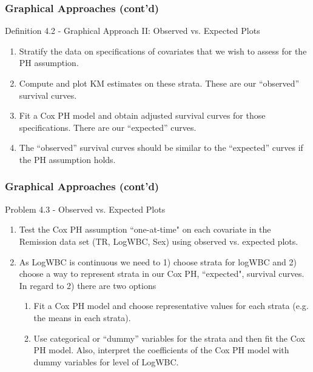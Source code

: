 \documentclass{beamer}
\theoremstyle{definition}
\begin{document}
\begin{frame}
\frametitle{Graphical Approaches (cont'd)}
\begin{block}{Definition 4.2 - Graphical Approach II: Observed vs. Expected Plots}
\begin{enumerate}
\item Stratify the data on specifications of covariates that we wish to assess for the PH assumption.
\item Compute and plot KM estimates on these strata. These are our ``observed'' survival curves.
\item Fit a Cox PH model and obtain adjusted survival curves for those specifications. There are our ``expected'' curves.
\item The ``observed'' survival curves should be similar to the ``expected'' curves if the PH assumption holds.
\end{enumerate}
\end{block}
\end{frame}

\begin{frame}
\frametitle{Graphical Approaches (cont'd)}
\begin{block}{Problem 4.3 - Observed vs. Expected Plots}
\begin{enumerate}
\item Test the Cox PH assumption ``one-at-time" on each covariate in the Remission data set (TR, LogWBC, Sex) using observed vs. expected plots.
\item As LogWBC is continuous we need to 1) choose strata for logWBC and 2) choose a way to represent strata in our Cox PH, ``expected", survival curves. In regard to 2) there are two options
\begin{enumerate}
\item Fit a Cox PH model and choose representative values for each strata (e.g. the means in each strata).
\item Use categorical or ``dummy'' variables for the strata and then fit the Cox PH model. Also, interpret the coefficients of the Cox PH model with dummy variables for level of LogWBC.
\end{enumerate}
\end{enumerate}
\end{block}
\end{frame}
\end{document}
